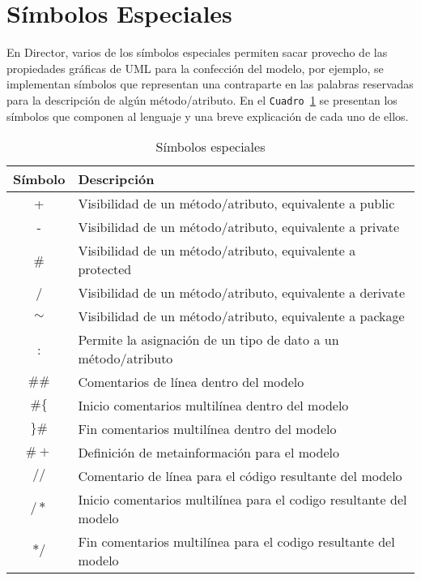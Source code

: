 \section{Símbolos Especiales}
\label{sec:simbolosespeciales}

En Director, varios de los símbolos especiales permiten sacar provecho de las
propiedades gráficas de UML para la confección del modelo, por ejemplo, se
implementan símbolos que representan una contraparte en las palabras reservadas
para la descripción de algún método/atributo. En el \texttt{Cuadro
\ref{c:s_especiales}} se presentan los símbolos que componen al lenguaje y una
breve explicación de cada uno de ellos.

\begin{table}[H]
\centering
\caption{Símbolos especiales}
\begin{tabular}{c p{9cm} }
\hline
	Símbolo & Descripción \\ \hline
	+ & Visibilidad de un método/atributo, equivalente a public\\
	- & Visibilidad de un método/atributo, equivalente a private\\
  \# & Visibilidad de un método/atributo, equivalente a protected\\
	/ & Visibilidad de un método/atributo, equivalente a derivate\\
$\sim$ & Visibilidad de un método/atributo, equivalente a package\\
	: & Permite la asignación de un tipo de dato a un método/atributo\\
$\#\#$ & Comentarios de línea dentro del modelo \\
$\#\{$ & Inicio comentarios multilínea dentro del modelo\\
$\}\#$ & Fin comentarios multilínea dentro del modelo\\
$\# +$ & Definición de metainformación para el modelo\\
$//$ & Comentario de línea para el código resultante del modelo\\
$/*$ & Inicio comentarios multilínea para el codigo resultante del modelo\\
$*/$ & Fin comentarios multilínea para el codigo resultante del modelo\\ \hline
\end{tabular}
\label{c:s_especiales}
\end{table}
